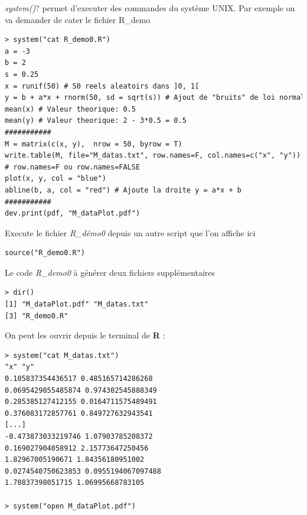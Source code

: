 \textit{system()}? permet d'executer des commandes du système UNIX. Par exemple on va demander de cater le fichier R\_demo
\begin{lstlisting}[language=html]
> system("cat R_demo0.R")
a = -3
b = 2
s = 0.25
x = runif(50) # 50 reels aleatoirs dans ]0, 1[
y = b + a*x + rnorm(50, sd = sqrt(s)) # Ajout de "bruits" de loi normale 
mean(x) # Valeur theorique: 0.5
mean(y) # Valeur theorique: 2 - 3*0.5 = 0.5
###########
M = matrix(c(x, y),  nrow = 50, byrow = T)
write.table(M, file="M_datas.txt", row.names=F, col.names=c("x", "y"))
# row.names=F ou row.names=FALSE
plot(x, y, col = "blue")
abline(b, a, col = "red") # Ajoute la droite y = a*x + b
###########
dev.print(pdf, "M_dataPlot.pdf")
\end{lstlisting}
Execute le fichier \textit{R\_démo0} depuis un autre script que l'on affiche ici 
\begin{lstlisting}[language=html]
source("R_demo0.R")
\end{lstlisting}
Le code \textit{R\_demo0} à générer deux fichiers supplémentaires
\begin{lstlisting}[language=html]
> dir()
[1] "M_dataPlot.pdf" "M_datas.txt"   
[3] "R_demo0.R"
\end{lstlisting}
On peut les ouvrir depuis le terminal de \textbf{R} :
\begin{lstlisting}[language=html]
> system("cat M_datas.txt")
"x" "y"
0.105837354436517 0.485165714286268
0.0695429055485874 0.974302545888349
0.285385127412155 0.0164711575489491
0.376083172857761 0.849727632943541
[...]
-0.473873033219746 1.07903785208372
0.169027904058912 2.15773647250456
1.82967005190671 1.84356180951002
0.0274540750623853 0.0955194067097488
1.70837398051715 1.06995668783105

> system("open M_dataPlot.pdf")
\end{lstlisting}


